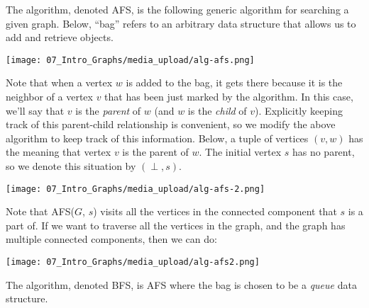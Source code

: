 \begin{definition}
\label{definition:Arbitrary-first-search-AFS-algorithm}
The  algorithm, denoted AFS, is the following generic algorithm for searching a given graph. Below, ``bag'' refers to an arbitrary data structure that allows us to add and retrieve objects. 

\begin{center}
    \texttt{[image: 07\_Intro\_Graphs/media\_upload/alg-afs.png]}
\end{center}

Note that when a vertex $w$ is added to the bag, it gets there because it is the neighbor of a vertex $v$ that has been just marked by the algorithm. In this case, we'll say that $v$ is the \emph{parent} of $w$ (and $w$ is the \emph{child} of $v$). Explicitly keeping track of this parent-child relationship is convenient, so we modify the above algorithm to keep track of this information. Below, a tuple of vertices $(v,w)$ has the meaning that vertex $v$ is the parent of $w$. The initial vertex $s$ has no parent, so we denote this situation by $(\perp, s)$.

\begin{center}
    \texttt{[image: 07\_Intro\_Graphs/media\_upload/alg-afs-2.png]}
\end{center}

\end{definition}

\begin{note}
\label{note:Traversing-all-the-vertices-in-the-graph}
Note that AFS($G$, $s$) visits all the vertices in the connected component that $s$ is a part of. If we want to traverse all the vertices in the graph, and the graph has multiple connected components, then we can do:
\begin{center}
    \texttt{[image: 07\_Intro\_Graphs/media\_upload/alg-afs2.png]}
\end{center}

\end{note}

\begin{definition}
\label{definition:Breadth-first-search-BFS-algorithm} 
The  algorithm, denoted BFS, is AFS where the bag is chosen to be a \emph{queue} data structure. 

\end{definition}

